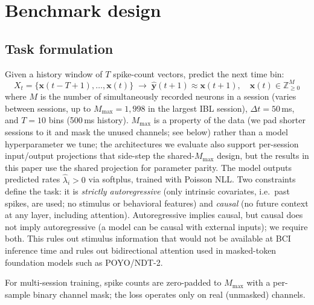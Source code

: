 \documentclass{article}
\begin{document}
\section{Benchmark design}
\label{sec:benchmark}

\subsection{Task formulation}
\label{sec:task}

Given a history window of $T$ spike-count vectors, predict the next
time bin:
\begin{equation}
  X_t = \{\mathbf{x}(t{-}T{+}1), \ldots, \mathbf{x}(t)\}
  \;\longrightarrow\;
  \hat{\mathbf{y}}(t{+}1) \approx \mathbf{x}(t{+}1),
  \quad \mathbf{x}(t) \in \mathbb{Z}_{\geq 0}^{M}
  \label{eq:task}
\end{equation}
where $M$ is the number of simultaneously recorded neurons in a
session (varies between sessions, up to $M_\mathrm{max}{=}1{,}998$
in the largest IBL session), $\Delta t = 50$\,ms, and $T = 10$
bins (500\,ms history).  $M_\mathrm{max}$ is a property of the
data (we pad shorter sessions to it and mask the unused channels;
see below) rather than a model hyperparameter we tune; the
architectures we evaluate also support per-session input/output
projections that side-step the shared-$M_\mathrm{max}$ design, but
the results in this paper use the shared projection for parameter
parity.  The model outputs predicted rates $\hat{\lambda}_i > 0$
via softplus, trained with Poisson NLL.  Two constraints define the task: it is
\emph{strictly autoregressive} (only intrinsic covariates, i.e.\ past
spikes, are used; no stimulus or behavioral features) and
\emph{causal} (no future context at any layer, including attention).
Autoregressive implies causal, but causal does not imply
autoregressive (a model can be causal with external inputs); we
require both.  This rules out stimulus information that would not
be available at BCI inference time and rules out bidirectional
attention used in masked-token foundation models such as POYO/NDT-2.

For multi-session training, spike counts are zero-padded to
$M_\mathrm{max}$ with a per-sample binary channel mask; the loss
operates only on real (unmasked) channels.

\end{document}

